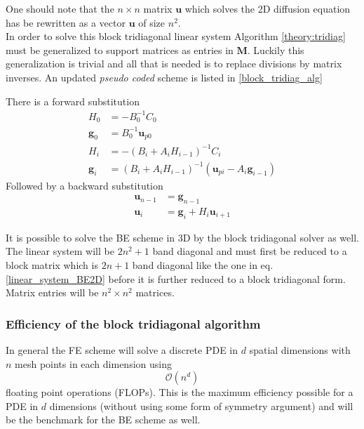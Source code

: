 One should note that the $n\times n$ matrix $\mathbf u$ which solves the 2D diffusion equation has be rewritten as a vector $\mathbf{u}$ of size $n^2$. \\ 

In order to solve this block tridiagonal linear system Algorithm \ref{theory:tridiag} must be generalized to support matrices as entries in $\mathbf M$. 
Luckily this generalization is trivial and all that is needed is to replace divisions by matrix inverses. 
An updated \emph{pseudo coded} scheme is listed in \eqref{block_tridiag_alg}

\noindent There is a forward substitution
\begin{align}\label{block_tridiag_alg}
 H_0 &= -B_0^{-1}C_0\nonumber \\
 \mathbf{g}_0 &= B_0^{-1}\mathbf{u}_{p0} \nonumber\\
 H_i &= -\left(B_i+A_iH_{i-1}\right)^{-1}C_i \nonumber \\
 \mathbf{g}_i &= \left(B_i+A_iH_{i-1}\right)^{-1}\left(\mathbf{u}_{pi}-A_i\mathbf{g}_{i-1}\right)
 \end{align}
 Followed by a backward substitution
 \begin{align*}
  \mathbf{u}_{n-1} &= \mathbf{g}_{n-1}\nonumber\\
  \mathbf{u}_i &= \mathbf{g}_i + H_i\mathbf{u}_{i+1} \nonumber
 \end{align*}
 
 \noindent It is possible to solve the BE scheme in 3D by the block tridiagonal solver as well. 
 The linear system will be $2n^2 +1$ band diagonal and must first be reduced to a block matrix which is $2n+1$ band diagonal like the one in eq. \eqref{linear_system_BE2D} before it is further reduced to a block tridiagonal form. 
 Matrix entries will be $n^2\times n^2$ matrices.
 
 \subsubsection{Efficiency of the block tridiagonal algorithm}
 
 In general the FE scheme will solve a discrete PDE in $d$ spatial dimensions with $n$ mesh points in each dimension using
 \begin{equation*}
  \mathcal O(n^d)
 \end{equation*}
floating point operations (FLOPs). 
This is the maximum efficiency possible for a PDE in $d$ dimensions (without using some form of symmetry argument) and will be the benchmark for the BE scheme as well.\\

